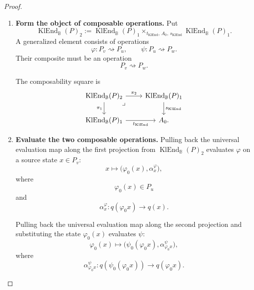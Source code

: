 \begin{proof}
\begin{enumerate}
        \item \textbf{Form the object of composable operations.}
        Put
        \[
            \operatorname{KlEnd}_{\mathbb B}(P)_2
            :=
            \operatorname{KlEnd}_{\mathbb B}(P)_1
            \times_{
                t_{\operatorname{KlEnd}},\,
                A_0,\,
                s_{\operatorname{KlEnd}}
            }
            \operatorname{KlEnd}_{\mathbb B}(P)_1.
        \]
        A generalized element consists of operations
        \[
            \varphi:P_v\rightsquigarrow P_u,
            \qquad
            \psi:P_u\rightsquigarrow P_w.
        \]
        Their composite must be an operation
        \[
            P_v\rightsquigarrow P_w.
        \]

        The composability square is
        \[
        \begin{tikzcd}
            \operatorname{KlEnd}_{\mathbb B}(P)_2
                \arrow[r, "\pi_2"]
                \arrow[d, "\pi_1"']
                \arrow[dr, phantom, "\lrcorner", very near start]
            &
            \operatorname{KlEnd}_{\mathbb B}(P)_1
                \arrow[d, "s_{\operatorname{KlEnd}}"]
            \\
            \operatorname{KlEnd}_{\mathbb B}(P)_1
                \arrow[r, "t_{\operatorname{KlEnd}}"']
            &
            A_0.
        \end{tikzcd}
        \]

        \item \textbf{Evaluate the two composable operations.}
        Pulling back the universal evaluation map along the first projection
        from
        \(\operatorname{KlEnd}_{\mathbb B}(P)_2\)
        evaluates \(\varphi\) on a source state \(x\in P_v\):
        \[
            x
            \longmapsto
            \bigl(
                \varphi_0(x),
                \alpha^\varphi_x
            \bigr),
        \]
        where
        \[
            \varphi_0(x)\in P_u
        \]
        and
        \[
            \alpha^\varphi_x:
            q(\varphi_0x)\to q(x).
        \]

        Pulling back the universal evaluation map along the second projection
        and substituting the state \(\varphi_0(x)\) evaluates \(\psi\):
        \[
            \varphi_0(x)
            \longmapsto
            \bigl(
                \psi_0(\varphi_0x),
                \alpha^\psi_{\varphi_0x}
            \bigr),
        \]
        where
        \[
            \alpha^\psi_{\varphi_0x}:
            q(\psi_0(\varphi_0x))
            \to
            q(\varphi_0x).
        \]


\end{enumerate}
\end{proof}
